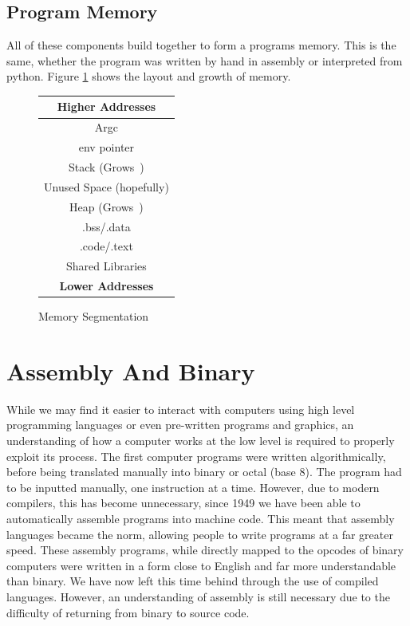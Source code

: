 					\subsection{Program Memory}
						All of these components build together to form a programs memory. 
						This is the same, whether the program was written by hand in assembly or interpreted from python. 
						Figure \ref{fig:ProgramMemory} shows the layout and growth of memory\cite{shellcodersHandbook}. 
						\begin{figure}[htb]
							\centering
							\begin{tabular}{|c|}
								\hline
								 \textbf{Higher Addresses}\enspace\arrowkeyup \\ \hline
								 Argc \\ \hline
								 env pointer \\ \hline
								 Stack (Grows \arrowkeydown\,) \\ \hline
								 Unused Space (hopefully) \\ \hline
								 Heap (Grows \arrowkeyup\,) \\ \hline
								 .bss/.data \\ \hline
								 .code/.text \\ \hline
								 Shared Libraries \\ \hline
								 \textbf{Lower Addresses}\enspace\arrowkeydown \\ \hline
							 \end{tabular}
							 \caption{Memory Segmentation}
							 \label{fig:ProgramMemory}
						 \end{figure}


	\section{Assembly And Binary}
		While we may find it easier to interact with computers using high level programming languages or even pre-written programs and graphics, an understanding of how a computer works at the low level is required to properly exploit its process. 
		The first computer programs were written algorithmically, before being translated manually into binary or octal (base 8). 
		The program had to be inputted manually, one instruction at a time. 
		However, due to modern compilers, this has become unnecessary, since 1949 we have been able to automatically assemble programs into machine code. 
		This meant that assembly languages became the norm, allowing people to write programs at a far greater speed.
		These assembly programs, while directly mapped to the opcodes of binary computers were written in a form close to English and far more understandable than binary. 
		We have now left this time behind through the use of compiled languages. 
		However, an understanding of assembly is still necessary due to the difficulty of returning from binary to source code. 
